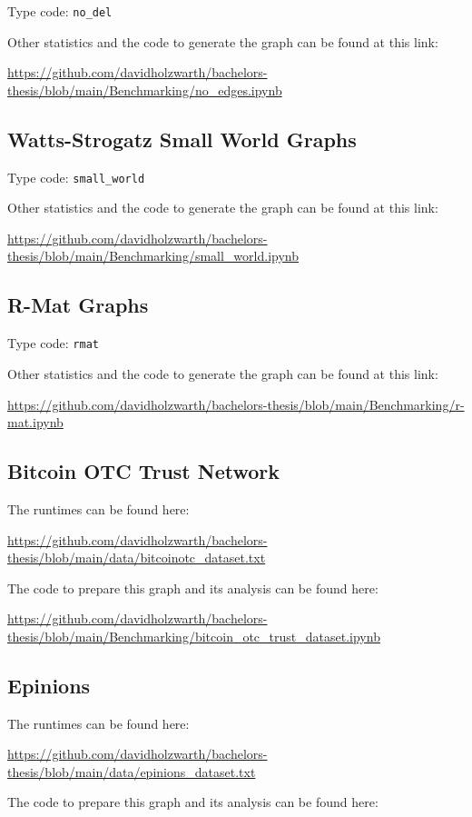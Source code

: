 Type code: \texttt{no\_del}

Other statistics and the code to generate the graph can be found at this link: 

\url{https://github.com/davidholzwarth/bachelors-thesis/blob/main/Benchmarking/no_edges.ipynb}

\subsection{Watts-Strogatz Small World Graphs}

Type code: \texttt{small\_world}

Other statistics and the code to generate the graph can be found at this link: 

\url{https://github.com/davidholzwarth/bachelors-thesis/blob/main/Benchmarking/small_world.ipynb}

\subsection{R-Mat Graphs}

Type code: \texttt{rmat}

Other statistics and the code to generate the graph can be found at this link: 

\url{https://github.com/davidholzwarth/bachelors-thesis/blob/main/Benchmarking/r-mat.ipynb}

\subsection{Bitcoin OTC Trust Network}

The runtimes can be found here:

\url{https://github.com/davidholzwarth/bachelors-thesis/blob/main/data/bitcoinotc_dataset.txt}

The code to prepare this graph and its analysis can be found here:

\url{https://github.com/davidholzwarth/bachelors-thesis/blob/main/Benchmarking/bitcoin_otc_trust_dataset.ipynb}

\subsection{Epinions}

The runtimes can be found here:

\url{https://github.com/davidholzwarth/bachelors-thesis/blob/main/data/epinions_dataset.txt}

The code to prepare this graph and its analysis can be found here:

